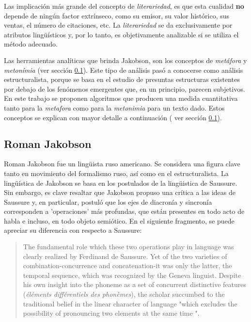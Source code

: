 \documentclass[12pt,letterpaper,twoside]{article}
\begin{document}
Las implicación más grande del concepto de \emph{literariedad}, es que
esta cualidad \textbf{no} depende de ningún factor extrínseco, como su
emisor, su valor histórico, sus ventas, el número de citaciones,
etc. La \emph{literariedad} se da exclusivamente por atributos
lingüísticos y, por lo tanto, es objetivamente analizable si se
utiliza el método adecuado.

Las herramientas analíticas que brinda Jakobson, son los conceptos
de \emph{metáfora} y \emph{metonímia} (ver sección \ref{sec:orgf89e914}).  Este tipo
de análisis pasó a conocerse como análisis estructuralista, porque
se basa en el estudio de presuntas estructuras existentes por debajo
de los fenómenos emergentes que, en un principio, parecen
subjetivos. En este trabajo se proponen algoritmos que producen una
medida cuantitativa tanto para la \emph{metafora} como para la \emph{metonimia}
para un texto dado. Estos conceptos se explican con mayor
detalle a continuación ( ver sección \ref{sec:orgf89e914}).


\subsection{Roman Jakobson}
\label{sec:orgf89e914}

Roman Jakobson fue un lingüista ruso americano. Se considera una
figura clave tanto en movimiento del formalismo ruso, así como en
el estructuralista.  La lingüística de Jakobson se basa en los
postulados de la lingüistica de Saussure. Sin embargo, es clave
resaltar que Jakobson propuso una crítica a las ideas de Saussure
y, en particular, postuló que los ejes de diacronía y sincronía
corresponden a 'operaciones' más profundas, que están presentes en
todo acto de habla e incluso, en todo objeto semiótico. En el
siguiente fragmento, se puede apreciar su diferencia con respecto
a Saussure:

\begin{quote}
The fundamental role which these two operations play in language
was clearly realized by Ferdinand de Saussure. Yet of the two
varieties of combination-concurrence and concatenation-it was only
the latter, the temporal sequence, which was recognized by the
Geneva linguist. Despite his own insight into the phoneme as a set
of concurrent distinctive features (\emph{éléments différentiels
des phonèmes}), the scholar succumbed to the traditional belief
in the linear character of language "which excludes the
possibility of pronouncing two elements at the same time ".
\cite[99]{jakobson1956two}
\end{quote}
\end{document}
